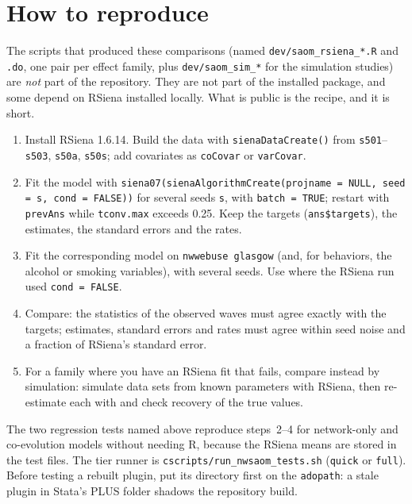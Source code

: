 \section{How to reproduce}
The scripts that produced these comparisons (named \texttt{dev/saom\_rsiena\_*.R} and \texttt{.do}, one pair per effect family, plus \texttt{dev/saom\_sim\_*} for the simulation studies) are \emph{not} part of the repository. They are not part of the installed package, and some depend on RSiena installed locally. What is public is the recipe, and it is short.
\begin{enumerate}
\item Install RSiena 1.6.14. Build the data with \texttt{sienaDataCreate()} from \texttt{s501}--\texttt{s503}, \texttt{s50a}, \texttt{s50s}; add covariates as \texttt{coCovar} or \texttt{varCovar}.
\item Fit the model with \texttt{siena07(sienaAlgorithmCreate(projname = NULL, seed = s, cond = FALSE))} for several seeds \texttt{s}, with \texttt{batch = TRUE}; restart with \texttt{prevAns} while \texttt{tconv.max} exceeds 0.25. Keep the targets (\texttt{ans\$targets}), the estimates, the standard errors and the rates.
\item Fit the corresponding \nwsaom{} model on \texttt{nwwebuse glasgow} (and, for behaviors, the alcohol or smoking variables), with several seeds. Use  where the RSiena run used \texttt{cond = FALSE}.
\item Compare: the statistics of the observed waves must agree exactly with the targets; estimates, standard errors and rates must agree within seed noise and a fraction of RSiena's standard error.
\item For a family where you have an RSiena fit that fails, compare instead by simulation: simulate data sets from known parameters with RSiena, then re-estimate each with \nwsaom{} and check recovery of the true values.
\end{enumerate}
The two regression tests named above reproduce steps~2--4 for network-only and co-evolution models without needing R, because the RSiena means are stored in the test files. The tier runner is \texttt{cscripts/run\_nwsaom\_tests.sh} (\texttt{quick} or \texttt{full}). Before testing a rebuilt plugin, put its directory first on the \texttt{adopath}: a stale plugin in Stata's PLUS folder shadows the repository build.
